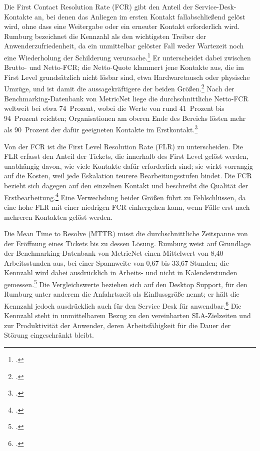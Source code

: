 Die First Contact Resolution Rate (FCR) gibt den Anteil der Service-Desk-Kontakte an, bei denen das Anliegen im ersten Kontakt fallabschlie{\ss}end gel\"ost wird, ohne dass eine Weitergabe oder ein erneuter Kontakt erforderlich wird. Rumburg bezeichnet die Kennzahl als den wichtigsten Treiber der Anwenderzufriedenheit, da ein unmittelbar gel\"oster Fall weder Wartezeit noch eine Wiederholung der Schilderung verursache.\footcite[Vgl.][S.~3]{Rumburg2011} Er unterscheidet dabei zwischen Brutto- und Netto-FCR; die Netto-Quote klammert jene Kontakte aus, die im First Level grunds\"atzlich nicht l\"osbar sind, etwa Hardwaretausch oder physische Umz\"uge, und ist damit die aussagekr\"aftigere der beiden Gr\"o{\ss}en.\footcite[Vgl.][S.~3]{Rumburg2011} Nach der Benchmarking-Datenbank von MetricNet liege die durchschnittliche Netto-FCR weltweit bei etwa 74~Prozent, wobei die Werte von rund 41~Prozent bis 94~Prozent reichten; Organisationen am oberen Ende des Bereichs l\"osten mehr als 90~Prozent der daf\"ur geeigneten Kontakte im Erstkontakt.\footcite[Vgl.][S.~5]{Rumburg2011}

Von der FCR ist die First Level Resolution Rate (FLR) zu unterscheiden. Die FLR erfasst den Anteil der Tickets, die innerhalb des First Level gel\"ost werden, unabh\"angig davon, wie viele Kontakte daf\"ur erforderlich sind; sie wirkt vorrangig auf die Kosten, weil jede Eskalation teurere Bearbeitungsstufen bindet. Die FCR bezieht sich dagegen auf den einzelnen Kontakt und beschreibt die Qualit\"at der Erstbearbeitung.\footcite[Vgl.][o.~S.]{Irizarry2021} Eine Verwechslung beider Gr\"o{\ss}en f\"uhrt zu Fehlschl\"ussen, da eine hohe FLR mit einer niedrigen FCR einhergehen kann, wenn F\"alle erst nach mehreren Kontakten gel\"ost werden.

Die Mean Time to Resolve (MTTR) misst die durchschnittliche Zeitspanne von der Er\"offnung eines Tickets bis zu dessen L\"osung. Rumburg weist auf Grundlage der Benchmarking-Datenbank von MetricNet einen Mittelwert von 8,40 Arbeitsstunden aus, bei einer Spannweite von 0,67 bis 33,67 Stunden; die Kennzahl wird dabei ausdr\"ucklich in Arbeits- und nicht in Kalenderstunden gemessen.\footcite[Vgl.][o.~S.]{Rumburg2018} Die Vergleichswerte beziehen sich auf den Desktop Support, f\"ur den Rumburg unter anderem die Anfahrtszeit als Einflussgr\"o{\ss}e nennt; er h\"alt die Kennzahl jedoch ausdr\"ucklich auch f\"ur den Service Desk f\"ur anwendbar.\footcite[Vgl.][o.~S.]{Rumburg2018} Die Kennzahl steht in unmittelbarem Bezug zu den vereinbarten SLA-Zielzeiten und zur Produktivit\"at der Anwender, deren Arbeitsf\"ahigkeit f\"ur die Dauer der St\"orung eingeschr\"ankt bleibt.

